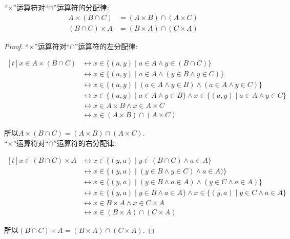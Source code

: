 \begin{proposition}
	``$\times$''运算符对``$\cap$''运算符的分配律:
	\begin{align}
		A\times (B\cap C) & =(A\times B)\cap (A\times C)\\
		(B\cap C)\times A & =(B\times A)\cap (C\times A)
	\end{align}
\end{proposition}

\begin{proof}
	``$\times$''运算符对``$\cap$''运算符的左分配律:

	$\begin{aligned}[t]
		x\in A\times (B\cap C) & \leftrightarrow x\in \{(a,y)\mid a\in A\wedge y\in (B\cap C)\}\\
		& \leftrightarrow x\in \{(a,y)\mid a\in A\wedge (y\in B\wedge y\in C)\}\\
		& \leftrightarrow x\in \{(a,y)\mid (a\in A\wedge y\in B)\wedge (a\in A\wedge y\in C)\}\\
		& \leftrightarrow x\in \{(a,y)\mid a\in A\wedge y\in B\}\wedge x\in \{(a,y)\mid a\in A\wedge y\in C\}\\
		& \leftrightarrow x\in A\times B\wedge x\in A\times C\\
		& \leftrightarrow x\in (A\times B)\cap (A\times C)
	\end{aligned}$

	所以$A\times (B\cap C)=(A\times B)\cap (A\times C)$.\\

	``$\times$''运算符对``$\cap$''运算符的右分配律:

	$\begin{aligned}[t]
		x\in (B\cap C)\times A & \leftrightarrow x\in \{(y,a)\mid y\in (B\cap C)\wedge a\in A\}\\
		& \leftrightarrow x\in \{(y,a)\mid (y\in B\wedge y\in C)\wedge a\in A)\}\\
		& \leftrightarrow x\in \{(y,a)\mid (y\in B\wedge a\in A)\wedge (y\in C\wedge a\in A)\}\\
		& \leftrightarrow x\in \{(y,a)\mid y\in B\wedge a\in A\}\wedge x\in \{(y,a)\mid y\in C\wedge a\in A\}\\
		& \leftrightarrow x\in B\times A\wedge x\in C\times A\\
		& \leftrightarrow x\in (B\times A)\cap (C\times A)
	\end{aligned}$
	
	所以$(B\cap C)\times A=(B\times A)\cap (C\times A)$.
\end{proof}

